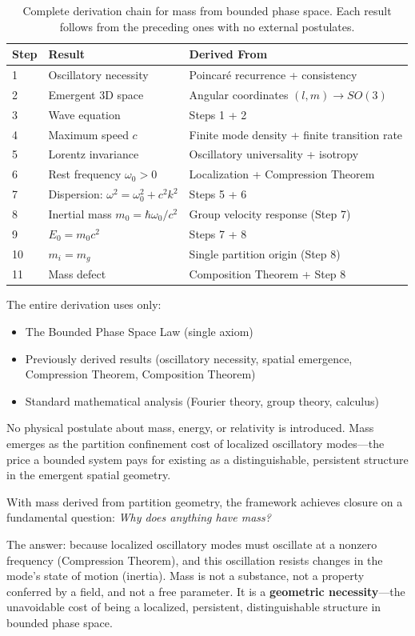 \begin{table}[H]
\centering
\caption{Complete derivation chain for mass from bounded phase space. Each result follows from the preceding ones with no external postulates.}
\label{tab:mass-derivation-chain}
\begin{tabular}{lll}
\toprule
\textbf{Step} & \textbf{Result} & \textbf{Derived From} \\
\midrule
1 & Oscillatory necessity & Poincar\'{e} recurrence + consistency \\
2 & Emergent 3D space & Angular coordinates $(l,m) \to SO(3)$ \\
3 & Wave equation & Steps 1 + 2 \\
4 & Maximum speed $c$ & Finite mode density + finite transition rate \\
5 & Lorentz invariance & Oscillatory universality + isotropy \\
6 & Rest frequency $\omega_0 > 0$ & Localization + Compression Theorem \\
7 & Dispersion: $\omega^2 = \omega_0^2 + c^2k^2$ & Steps 5 + 6 \\
8 & Inertial mass $m_0 = \hbar\omega_0/c^2$ & Group velocity response (Step 7) \\
9 & $E_0 = m_0 c^2$ & Steps 7 + 8 \\
10 & $m_i = m_g$ & Single partition origin (Step 8) \\
11 & Mass defect & Composition Theorem + Step 8 \\
\bottomrule
\end{tabular}
\end{table}

The entire derivation uses only:
\begin{itemize}
    \item The Bounded Phase Space Law (single axiom)
    \item Previously derived results (oscillatory necessity, spatial emergence, Compression Theorem, Composition Theorem)
    \item Standard mathematical analysis (Fourier theory, group theory, calculus)
\end{itemize}

No physical postulate about mass, energy, or relativity is introduced. Mass emerges as the partition confinement cost of localized oscillatory modes---the price a bounded system pays for existing as a distinguishable, persistent structure in the emergent spatial geometry.

\begin{remark}
With mass derived from partition geometry, the framework achieves closure on a fundamental question: \textit{Why does anything have mass?}

The answer: because localized oscillatory modes must oscillate at a nonzero frequency (Compression Theorem), and this oscillation resists changes in the mode's state of motion (inertia). Mass is not a substance, not a property conferred by a field, and not a free parameter. It is a \textbf{geometric necessity}---the unavoidable cost of being a localized, persistent, distinguishable structure in bounded phase space.
\end{remark}
